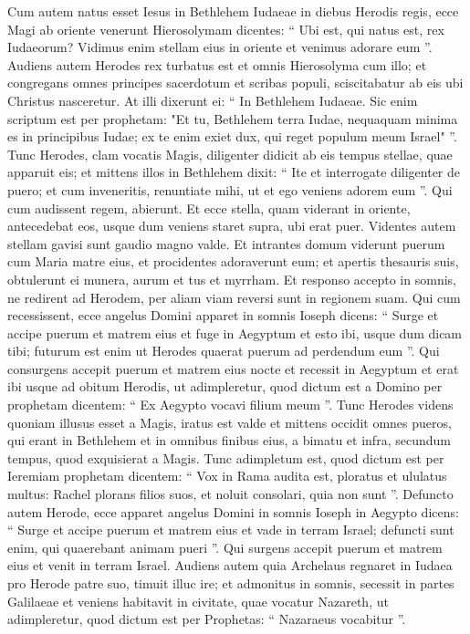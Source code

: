 \begin{biblechapter}
\begin{biblechapter}
\verse Cum autem natus esset Iesus in Bethlehem Iudaeae in diebus Herodis regis, ecce Magi ab oriente venerunt Hierosolymam 
\verse dicentes: “ Ubi est, qui natus est, rex Iudaeorum? Vidimus enim stellam eius in oriente et venimus adorare eum ”. 
\verse Audiens autem Herodes rex turbatus est et omnis Hierosolyma cum illo; 
 \verse et congregans omnes principes sacerdotum et scribas populi, sciscitabatur ab eis ubi Christus nasceretur. 
\verse At illi dixerunt ei: “ In Bethlehem Iudaeae. Sic enim scriptum est per prophetam:
 \verse "Et tu, Bethlehem terra Iudae,
 nequaquam minima es in principibus Iudae;
 ex te enim exiet dux,
 qui reget populum meum Israel" ”.
 \verse Tunc Herodes, clam vocatis Magis, diligenter didicit ab eis tempus stellae, quae apparuit eis; 
\verse et mittens illos in Bethlehem dixit: “ Ite et interrogate diligenter de puero; et cum inveneritis, renuntiate mihi, ut et ego veniens adorem eum ”.
 \verse Qui cum audissent regem, abierunt. Et ecce stella, quam viderant in oriente, antecedebat eos, usque dum veniens staret supra, ubi erat puer. 
\verse Videntes autem stellam gavisi sunt gaudio magno valde. 
\verse Et intrantes domum viderunt puerum cum Maria matre eius, et procidentes adoraverunt eum; et apertis thesauris suis, obtulerunt ei munera, aurum et tus et myrrham. 
\verse Et responso accepto in somnis, ne redirent ad Herodem, per aliam viam reversi sunt in regionem suam.
 \verse Qui cum recessissent, ecce angelus Domini apparet in somnis Ioseph dicens: “ Surge et accipe puerum et matrem eius et fuge in Aegyptum et esto ibi, usque dum dicam tibi; futurum est enim ut Herodes quaerat puerum ad perdendum eum ”.
 \verse Qui consurgens accepit puerum et matrem eius nocte et recessit in Aegyptum 
 \verse et erat ibi usque ad obitum Herodis, ut adimpleretur, quod dictum est a Domino per prophetam dicentem:
 “ Ex Aegypto vocavi filium meum ”.
 \verse Tunc Herodes videns quoniam illusus esset a Magis, iratus est valde et mittens occidit omnes pueros, qui erant in Bethlehem et in omnibus finibus eius, a bimatu et infra, secundum tempus, quod exquisierat a Magis. 
\verse Tunc adimpletum est, quod dictum est per Ieremiam prophetam dicentem:
 \verse “ Vox in Rama audita est,
 ploratus et ululatus multus:
 Rachel plorans filios suos,
 et noluit consolari, quia non sunt ”.
 \verse Defuncto autem Herode, ecce apparet angelus Domini in somnis Ioseph in Aegypto 
\verse dicens: “ Surge et accipe puerum et matrem eius et vade in terram Israel; defuncti sunt enim, qui quaerebant animam pueri ”. 
\verse Qui surgens accepit puerum et matrem eius et venit in terram Israel.
 \verse Audiens autem quia Archelaus regnaret in Iudaea pro Herode patre suo, timuit illuc ire; et admonitus in somnis, secessit in partes Galilaeae 
\verse et veniens habitavit in civitate, quae vocatur Nazareth, ut adimpleretur, quod dictum est per Prophetas: “ Nazaraeus vocabitur ”.
 

\end{biblechapter}
\end{biblechapter}
